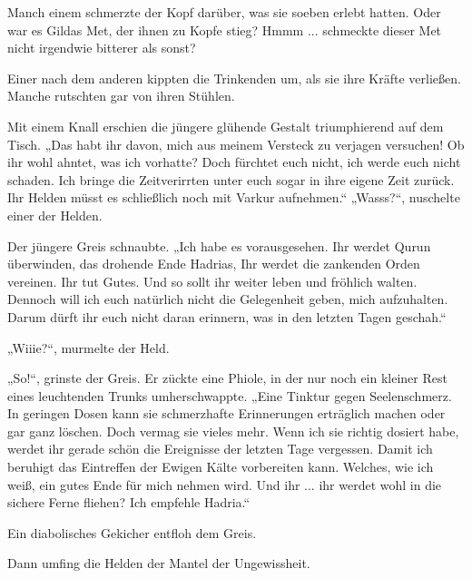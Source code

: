 Manch einem schmerzte der Kopf darüber, was sie soeben erlebt hatten. Oder war es Gildas Met, der ihnen zu Kopfe stieg? Hmmm ... schmeckte dieser Met nicht irgendwie bitterer als sonst?

Einer nach dem anderen kippten die Trinkenden um, als sie ihre Kräfte verließen. Manche rutschten gar von ihren Stühlen. 

Mit einem Knall erschien die jüngere glühende Gestalt triumphierend auf dem Tisch. „Das habt ihr davon, mich aus meinem Versteck zu verjagen versuchen! Ob ihr wohl ahntet, was ich vorhatte? Doch fürchtet euch nicht, ich werde euch nicht schaden. Ich bringe die Zeitverirrten unter euch sogar in ihre eigene Zeit zurück. Ihr Helden müsst es schließlich noch mit Varkur aufnehmen.“ „Wasss?“, nuschelte einer der Helden. 

Der jüngere Greis schnaubte. „Ich habe es vorausgesehen. Ihr werdet Qurun überwinden, das drohende Ende Hadrias, Ihr werdet die zankenden Orden vereinen. Ihr tut Gutes. Und so sollt ihr weiter leben und fröhlich walten. Dennoch will ich euch natürlich nicht die Gelegenheit geben, mich aufzuhalten. Darum dürft ihr euch nicht daran erinnern, was in den letzten Tagen geschah.“ 

„Wiiie?“, murmelte der Held.

„So!“, grinste der Greis. Er zückte eine Phiole, in der nur noch ein kleiner Rest eines leuchtenden Trunks umherschwappte. „Eine Tinktur gegen Seelenschmerz. In geringen Dosen kann sie schmerzhafte Erinnerungen erträglich machen oder gar ganz löschen. Doch vermag sie vieles mehr. Wenn ich sie richtig dosiert habe, werdet ihr gerade schön die Ereignisse der letzten Tage vergessen. Damit ich beruhigt das Eintreffen der Ewigen Kälte vorbereiten kann. Welches, wie ich weiß, ein gutes Ende für mich nehmen wird. Und ihr ... ihr werdet wohl in die sichere Ferne fliehen? Ich empfehle Hadria.“

Ein diabolisches Gekicher entfloh dem Greis.

Dann umfing die Helden der Mantel der Ungewissheit.

\newpage




